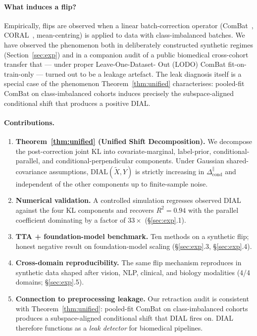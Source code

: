\documentclass{article}
\newcommand{\dial}{\mathrm{DIAL}}
\begin{document}
\paragraph{What induces a flip?}
Empirically, flips are observed when a linear batch-correction operator
(ComBat~\citep{johnson2007combat}, CORAL~\citep{sun2016coral},
mean-centring) is applied to data with class-imbalanced batches. We
have observed the phenomenon both in deliberately constructed synthetic
regimes (Section~\ref{sec:exp}) and in a companion audit of a public
biomedical cross-cohort transfer that — under proper Leave-One-Dataset-
Out (LODO) ComBat fit-on-train-only — turned out to be a leakage
artefact. The leak diagnosis itself is a special case of the
phenomenon Theorem~\ref{thm:unified} characterises: pooled-fit ComBat
on class-imbalanced cohorts induces precisely the subspace-aligned
conditional shift that produces a positive DIAL.

\paragraph{Contributions.}
\begin{enumerate}
\item \textbf{Theorem~\ref{thm:unified} (Unified Shift Decomposition).}
  We decompose the post-correction joint KL into covariate-marginal,
  label-prior, conditional-parallel, and conditional-perpendicular
  components. Under Gaussian shared-covariance assumptions,
  $\dial(\tilde X,Y)$ is strictly increasing in
  $\Delta_{\text{cond}}^{\parallel}$ and independent of the other
  components up to finite-sample noise.
\item \textbf{Numerical validation.} A controlled simulation regresses
  observed DIAL against the four KL components and recovers
  $R^{2}=0.94$ with the parallel coefficient dominating by a factor
  of $33\times$ (\S\ref{sec:exp}.1).
\item \textbf{TTA + foundation-model benchmark.} Ten methods on a
  synthetic flip; honest negative result on foundation-model scaling
  (\S\ref{sec:exp}.3, \S\ref{sec:exp}.4).
\item \textbf{Cross-domain reproducibility.} The same flip mechanism
  reproduces in synthetic data shaped after vision, NLP, clinical, and
  biology modalities (4/4 domains; \S\ref{sec:exp}.5).
\item \textbf{Connection to preprocessing leakage.} Our retraction
  audit is consistent with Theorem~\ref{thm:unified}: pooled-fit
  ComBat on class-imbalanced cohorts produces a subspace-aligned
  conditional shift that DIAL fires on. DIAL therefore functions as a
  \emph{leak detector} for biomedical pipelines.
\end{enumerate}
\end{document}
